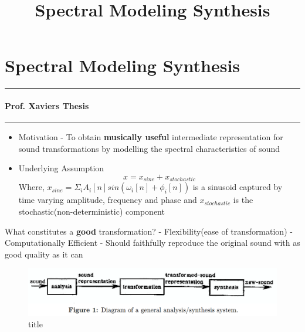 \documentclass[11pt]{article}
\title{Spectral Modeling Synthesis}
\makeatletter
\def\maxwidth{\ifdim\Gin@nat@width>\linewidth\linewidth
    \else\Gin@nat@width\fi}
\let\Oldincludegraphics\includegraphics
\renewcommand{\includegraphics}[1]{\Oldincludegraphics[width=.8\maxwidth]{#1}}
\providecommand{\tightlist}{%
      \setlength{\itemsep}{0pt}\setlength{\parskip}{0pt}}
\makeatother
\begin{document}
    
    
    \maketitle
    
    

    
    \section{Spectral Modeling Synthesis}\label{spectral-modeling-synthesis}

    \begin{center}\rule{0.5\linewidth}{\linethickness}\end{center}

\paragraph{Prof. Xaviers Thesis}\label{prof.-xaviers-thesis}

\begin{center}\rule{0.5\linewidth}{\linethickness}\end{center}

    \begin{itemize}
\tightlist
\item
  Motivation - To obtain \textbf{musically useful} intermediate
  representation for sound transformations by modelling the spectral
  characteristics of sound
\item
  Underlying Assumption \[ x = x_{sine} + x_{stochastic}\] Where,
  \(x_{sine} = \Sigma_{i} A_{i}[n]sin(\omega_{i}[n] + \phi_{i}[n])\) is
  a sinusoid captured by time varying amplitude, frequency and phase and
  \(x_{stochastic}\) is the stochastic(non-deterministic) component
\end{itemize}

    What constitutes a \textbf{good} transformation? - Flexibility(ease of
transformation) - Computationally Efficient - Should faithfully
reproduce the original sound with as good quality as it can

    \begin{figure}
\centering
\includegraphics{fig_1.png}
\caption{title}
\end{figure}
\end{document}
